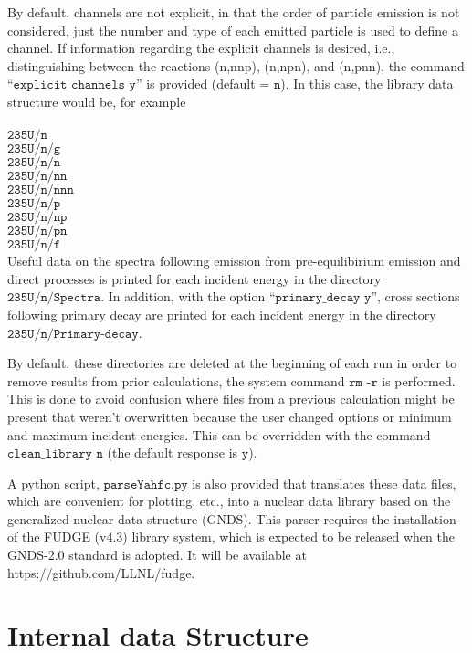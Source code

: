 \documentclass[
10pt,
showpacs,preprintnumbers,footinbib,
amsfonts,amsmath,amssymb,
aps,
prc,twocolumn,groupedaddress,superscriptaddress,
showkeys,
nofootinbib
]{revtex4-1}
\begin{document}
By default, channels are not explicit, in that the order of particle emission is not considered, just the number and type of each emitted particle is used to define a channel. If information regarding the explicit channels is desired, i.e., distinguishing between the reactions (n,nnp), (n,npn), and (n,pnn), the command ``${\texttt{explicit\_channels y}}$'' is provided (default = ${\texttt{n}}$). In this case, the library data structure would be, for example\\
\\
${\texttt{235U/n}}$\\
${\texttt{235U/n/g}}$\\
${\texttt{235U/n/n}}$\\
${\texttt{235U/n/nn}}$\\
${\texttt{235U/n/nnn}}$\\
${\texttt{235U/n/p}}$\\
${\texttt{235U/n/np}}$\\
${\texttt{235U/n/pn}}$\\
${\texttt{235U/n/f}}$\\

Useful data on the spectra following emission from pre-equilibirium emission and direct processes is printed for each incident energy in the directory ${\texttt{235U/n/Spectra}}$. In addition, with the option ``${\texttt{primary\_decay y}}$'', cross sections following primary decay are printed for each incident energy in the directory ${\texttt{235U/n/Primary-decay}}$.

By default, these directories are deleted at the beginning of each run in order to remove results from prior calculations, the system command ${\texttt{rm -r}}$ is performed. This is done to avoid confusion where files from a previous calculation might be present that weren't overwritten because the user changed options or minimum and maximum incident energies. This can be overridden with the command ${\texttt{clean\_library n}}$ (the default response is ${\texttt{y}}$). 

A python script, ${\texttt{parseYahfc.py}}$ is also provided that translates these data files, which are convenient for plotting, etc., into a nuclear data library based on the generalized nuclear data structure (GNDS). This parser requires the installation of the FUDGE (v4.3) library system, which is expected to be released when the GNDS-2.0 standard is adopted. It will be available at  https://github.com/LLNL/fudge.

\section{Internal data Structure}
\end{document}

